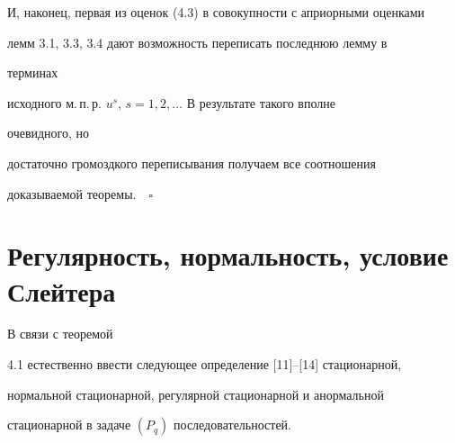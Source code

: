  


И, наконец, первая из оценок (4.3) в совокупности с априорными оценками 


лемм 3.1, 3.3, 3.4 дают возможность переписать последнюю лемму в 


терминах 


исходного м.\,п.\,р. $u^s$, $s=1,2,\dotsc$ В результате такого вполне 


очевидного, но 


достаточно громоздкого переписывания получаем все соотношения 


доказываемой теоремы.$\quad\square$ 


 


\section{Регулярность, нормальность, условие Слейтера} 


 


В связи с теоремой 


4.1 естественно ввести следующее определение [11]--[14] стационарной,


нормальной стационарной, регулярной стационарной и анормальной 


стационарной в задаче $(P_q)$ последовательностей. 


 


